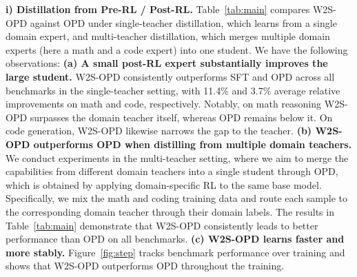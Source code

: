 \documentclass{article}
\newcommand\ours{W2S-OPD\xspace}
\begin{document}
\textbf{i) Distillation from Pre-RL / Post-RL.}
Table~\ref{tab:main} compares \ours against OPD under single-teacher distillation, which learns from a single domain expert, and multi-teacher distillation, which merges multiple domain experts (here a math and a code expert) into one student. We have the following observations:
\noindent\textbf{(a) A small post-RL expert substantially improves the large student.} \ours consistently outperforms SFT and OPD across all benchmarks in the single-teacher setting, with 11.4\% and 3.7\% average relative improvements on math and code, respectively. Notably, on math reasoning \ours surpasses the domain teacher itself, whereas OPD remains below it. On code generation, \ours likewise narrows the gap to the teacher. \textbf{(b) \ours outperforms OPD when distilling from multiple domain teachers.} We conduct experiments in the multi-teacher setting, where we aim to merge the capabilities from different domain teachers into a single student through OPD, which is obtained by applying domain-specific RL to the same base model. Specifically, we mix the math and coding training data and route each sample to the corresponding domain teacher through their domain labels. The results in Table~\ref{tab:main} demonstrate that \ours consistently leads to better performance than OPD on all benchmarks. 
\textbf{(c) \ours learns faster and more stably.} Figure~\ref{fig:step} tracks benchmark performance over training and shows that \ours outperforms OPD throughout the training.
\end{document}
